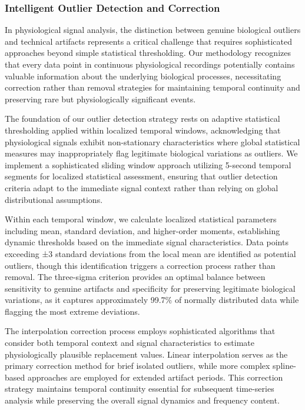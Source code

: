 \documentclass[a4paper,12pt,twoside]{article}
\begin{document}
\subsubsection{Intelligent Outlier Detection and Correction}

In physiological signal analysis, the distinction between genuine biological outliers and technical artifacts represents a critical challenge that requires sophisticated approaches beyond simple statistical thresholding. Our methodology recognizes that every data point in continuous physiological recordings potentially contains valuable information about the underlying biological processes, necessitating correction rather than removal strategies for maintaining temporal continuity and preserving rare but physiologically significant events.

The foundation of our outlier detection strategy rests on adaptive statistical thresholding applied within localized temporal windows, acknowledging that physiological signals exhibit non-stationary characteristics where global statistical measures may inappropriately flag legitimate biological variations as outliers. We implement a sophisticated sliding window approach utilizing 5-second temporal segments for localized statistical assessment, ensuring that outlier detection criteria adapt to the immediate signal context rather than relying on global distributional assumptions.

Within each temporal window, we calculate localized statistical parameters including mean, standard deviation, and higher-order moments, establishing dynamic thresholds based on the immediate signal characteristics. Data points exceeding ±3 standard deviations from the local mean are identified as potential outliers, though this identification triggers a correction process rather than removal. The three-sigma criterion provides an optimal balance between sensitivity to genuine artifacts and specificity for preserving legitimate biological variations, as it captures approximately 99.7\% of normally distributed data while flagging the most extreme deviations.

The interpolation correction process employs sophisticated algorithms that consider both temporal context and signal characteristics to estimate physiologically plausible replacement values. Linear interpolation serves as the primary correction method for brief isolated outliers, while more complex spline-based approaches are employed for extended artifact periods. This correction strategy maintains temporal continuity essential for subsequent time-series analysis while preserving the overall signal dynamics and frequency content.
\end{document}
